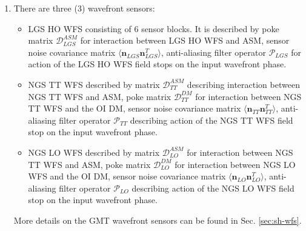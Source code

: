 \begin{enumerate}
	\item There are three (3) wavefront sensors:
	\begin{itemize}
		\item LGS HO WFS consisting of 6 sensor blocks. It is described by poke
		matrix $\mathcal{D}_{LGS}^{ASM}$ for interaction between LGS HO WFS
		and ASM, sensor noise covariance matrix
		$\langle \bm{n}_{LGS}^{} \bm{n}_{LGS}^{T} \rangle$, anti-aliasing filter
		operator $\mathcal{P}_{LGS}$ for action of the LGS HO WFS field
		stops on the input wavefront phase.
		\item NGS TT WFS described by matrix $\mathcal{D}_{TT}^{ASM}$ describing
		interaction between NGS TT WFS
		and ASM, poke matrix $\mathcal{D}_{TT}^{DM}$ for interaction between NGS
		TT WFS and the OI DM, sensor noise covariance matrix
		$\langle \bm{n}_{TT}^{} \bm{n}_{TT}^{T} \rangle$, anti-aliasing filter
		operator $\mathcal{P}_{TT}$ describing action of the NGS TT WFS field
		stop on the input wavefront phase.
		\item NGS LO WFS described by matrix $\mathcal{D}_{LO}^{ASM}$ for
		interaction between NGS TT WFS
		and ASM, poke matrix $\mathcal{D}_{LO}^{DM}$ for interaction between NGS
		LO WFS and the OI DM, sensor noise covariance matrix
		$\langle \bm{n}_{LO}^{} \bm{n}_{LO}^{T} \rangle$, anti-aliasing filter
		operator $\mathcal{P}_{LO}$ describing action of the NGS LO WFS field
		stop on the input wavefront phase.
	\end{itemize}
	More details on the GMT wavefront sensors can be found in
	Sec. \ref{sec:sh-wfs}.


\end{enumerate}
